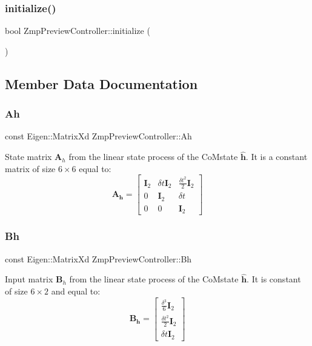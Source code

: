 \subsubsection{\texorpdfstring{initialize()}{initialize()}}
{\footnotesize\ttfamily bool Zmp\+Preview\+Controller\+::initialize (\begin{DoxyParamCaption}{ }\end{DoxyParamCaption})}



\subsection{Member Data Documentation}
\hypertarget{classZmpPreviewController_a8ee8ec415e25374f4fa687f5a5a6b9df}{}\label{classZmpPreviewController_a8ee8ec415e25374f4fa687f5a5a6b9df} 
\subsubsection{\texorpdfstring{Ah}{Ah}}
{\footnotesize\ttfamily const Eigen\+::\+Matrix\+Xd Zmp\+Preview\+Controller\+::\+Ah\hspace{0.3cm}{\ttfamily [private]}}

State matrix $\mathbf{A}_h$ from the linear state process of the Co\+Mstate $\hat{\mathbf{h}}$. It is a constant matrix of size $6\times6$ equal to\+: \[ \mathbf{A_h} = \left[ \begin{array}{ccc} \mathbf{I}_2 & \delta t \mathbf{I}_2 & \frac{\delta t^2}{2} \mathbf{I}_2 \\ 0 & \mathbf{I}_2 & \delta t \\ 0 & 0 & \mathbf{I}_2 \end{array} \right] \] \hypertarget{classZmpPreviewController_a98bd07d03d0a6004b345ef4310cf17b6}{}\label{classZmpPreviewController_a98bd07d03d0a6004b345ef4310cf17b6} 
\subsubsection{\texorpdfstring{Bh}{Bh}}
{\footnotesize\ttfamily const Eigen\+::\+Matrix\+Xd Zmp\+Preview\+Controller\+::\+Bh\hspace{0.3cm}{\ttfamily [private]}}

Input matrix $\mathbf{B}_h$ from the linear state process of the Co\+Mstate $\hat{\mathbf{h}}$. It is constant of size $6\times2$ and equal to\+: \[ \mathbf{B_h} = \left[ \begin{array}{c} \frac{\delta^3}{6}\mathbf{I}_2 \\ \frac{\delta t^2}{2} \mathbf{I}_2 \\ \delta t \mathbf{I}_2 \end{array} \right] \] \hypertarget{classZmpPreviewController_a2093754713ffb2a7adcd1310c73bf775}{}\label{classZmpPreviewController_a2093754713ffb2a7adcd1310c73bf775} 
